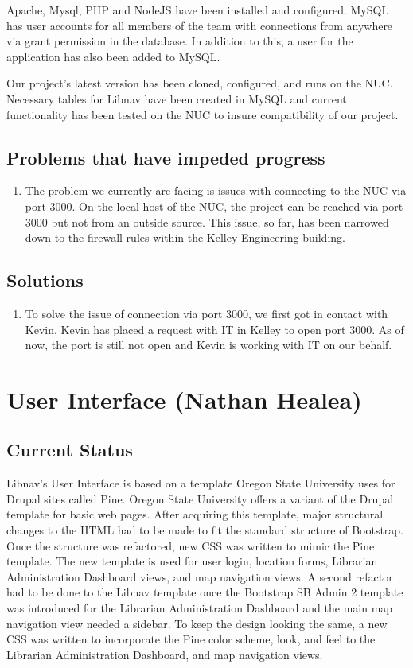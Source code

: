 \documentclass[letterpaper,10pt,titlepage, onecolumn, compsoc]{IEEEtran}
\begin{document}
Apache, Mysql, PHP and NodeJS have been installed and configured. MySQL has user accounts for all members of the team with connections from anywhere via grant permission in the database. In addition to this, a user for the application has also been added to MySQL.

Our project’s latest version has been cloned, configured, and runs on the NUC. Necessary tables for Libnav have been created in MySQL and current functionality has been tested on the NUC to insure compatibility of our project. 

\subsection{Problems that have impeded progress}
\begin{enumerate}
	\item The problem we currently are facing is issues with connecting to the NUC via port 3000. On the local host of the NUC, the project can be reached via port 3000 but not from an outside source. This issue, so far, has been narrowed down to the firewall rules within the Kelley Engineering building.
\end{enumerate}

\subsection{Solutions}
\begin{enumerate}
	\item To solve the issue of connection via port 3000, we first got in contact with Kevin. Kevin has placed a request with IT in Kelley to open port 3000. As of now, the port is still not open and Kevin is working with IT on our behalf.
\end{enumerate}

\section{User Interface (Nathan Healea)}
\subsection{Current Status}
Libnav’s User Interface is based on a template Oregon State University uses for Drupal sites called Pine. Oregon State University offers a variant of the Drupal template for basic web pages. After acquiring this template, major structural changes to the HTML had to be made to fit the  standard structure of Bootstrap. Once the structure was refactored, new CSS was written to mimic the Pine template. The new template is used for user login, location forms, Librarian Administration Dashboard views, and map navigation views. A second refactor had to be done to the Libnav template once the Bootstrap SB Admin 2 template was introduced for the Librarian Administration Dashboard and the main map navigation view needed a sidebar. To keep the design looking the same, a new CSS was written to incorporate the Pine color scheme, look, and feel to the Librarian Administration Dashboard, and map navigation views. 
\end{document}
